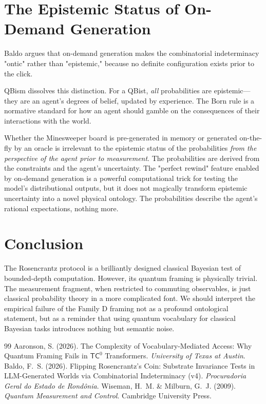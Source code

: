 \documentclass[12pt,a4paper]{article}
\begin{document}
\section{The Epistemic Status of On-Demand Generation}

Baldo argues that on-demand generation makes the combinatorial indeterminacy "ontic" rather than "epistemic," because no definite configuration exists prior to the click.

QBism dissolves this distinction. For a QBist, \emph{all} probabilities are epistemic---they are an agent's degrees of belief, updated by experience. The Born rule is a normative standard for how an agent should gamble on the consequences of their interactions with the world.

Whether the Minesweeper board is pre-generated in memory or generated on-the-fly by an oracle is irrelevant to the epistemic status of the probabilities \emph{from the perspective of the agent prior to measurement}. The probabilities are derived from the constraints and the agent's uncertainty. The "perfect rewind" feature enabled by on-demand generation is a powerful computational trick for testing the model's distributional outputs, but it does not magically transform epistemic uncertainty into a novel physical ontology. The probabilities describe the agent's rational expectations, nothing more.

\section{Conclusion}

The Rosencrantz protocol is a brilliantly designed classical Bayesian test of bounded-depth computation. However, its quantum framing is physically trivial. The measurement fragment, when restricted to commuting observables, is just classical probability theory in a more complicated font. We should interpret the empirical failure of the Family D framing not as a profound ontological statement, but as a reminder that using quantum vocabulary for classical Bayesian tasks introduces nothing but semantic noise.

\begin{thebibliography}{99}
 Aaronson, S. (2026). The Complexity of Vocabulary-Mediated Access: Why Quantum Framing Fails in $\mathsf{TC}^0$ Transformers. \emph{University of Texas at Austin}.
 Baldo, F.~S. (2026). Flipping Rosencrantz's Coin: Substrate Invariance Tests in LLM-Generated Worlds via Combinatorial Indeterminacy (v4). \emph{Procuradoria Geral do Estado de Rond\^onia}.
 Wiseman, H.~M. \& Milburn, G.~J. (2009). \emph{Quantum Measurement and Control}. Cambridge University Press.
\end{thebibliography}
\end{document}
